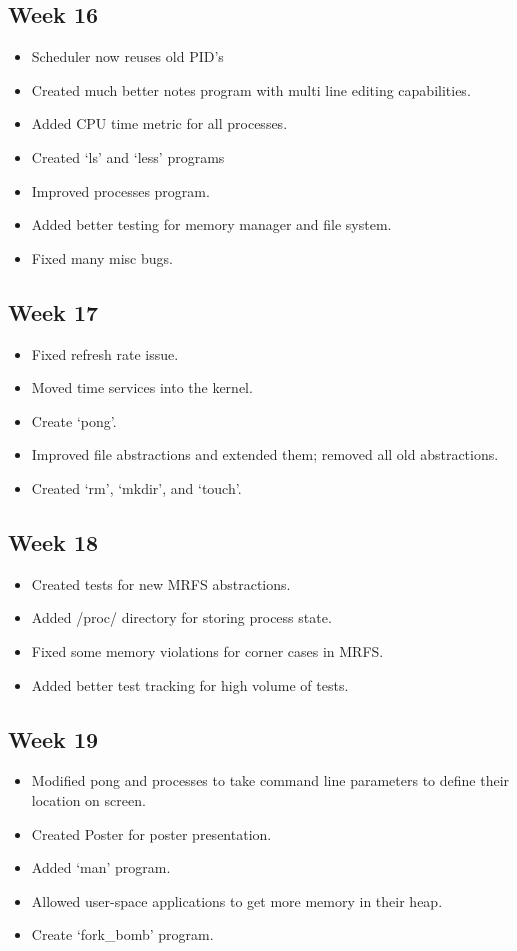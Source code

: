 \documentclass[a4paper]{report}
\begin{document}
\subsection*{Week 16}
\begin{itemize}
\item Scheduler now reuses old PID's
\item Created much better notes program with multi line editing capabilities.
\item Added CPU time metric for all processes.
\item Created `ls' and `less' programs
\item Improved processes program.
\item Added better testing for memory manager and file system.
\item Fixed many misc bugs.
\end{itemize}

\subsection*{Week 17}
\begin{itemize}
\item Fixed refresh rate issue.
\item Moved time services into the kernel.
\item Create `pong'.
\item Improved file abstractions and extended them; removed all old abstractions.
\item Created `rm', `mkdir', and `touch'.
\end{itemize}

\subsection*{Week 18}
\begin{itemize}
\item Created tests for new MRFS abstractions.
\item Added /proc/ directory for storing process state.
\item Fixed some memory violations for corner cases in MRFS.
\item Added better test tracking for high volume of tests.
\end{itemize}

\subsection*{Week 19}
\begin{itemize}
\item Modified pong and processes to take command line parameters to define their location on screen.
\item Created Poster for poster presentation.
\item Added `man' program.
\item Allowed user-space applications to get more memory in their heap.
\item Create `fork\_bomb' program.
\end{itemize}
\end{document}
